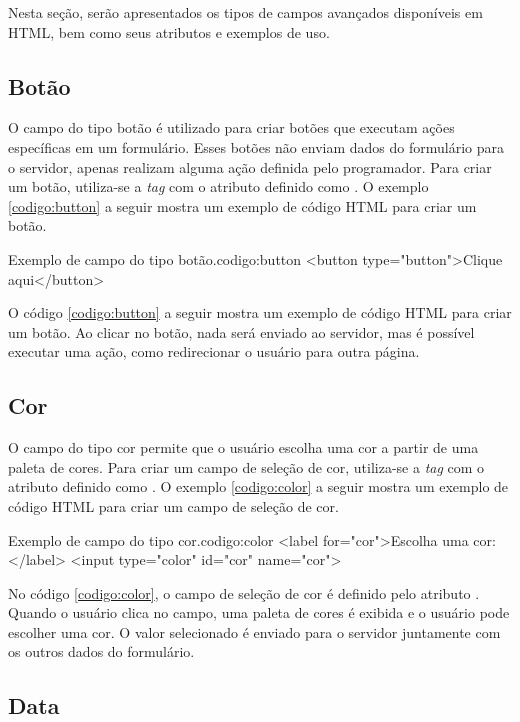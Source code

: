 Nesta seção, serão apresentados os tipos de campos avançados disponíveis em HTML, bem como seus atributos e exemplos de uso.

\subsection{Botão}

O campo do tipo botão é utilizado para criar botões que executam ações específicas em um formulário. Esses botões não enviam dados do formulário para o servidor, apenas realizam alguma ação definida pelo programador. Para criar um botão, utiliza-se a \textit{tag}  com o atributo  definido como . O exemplo \ref{codigo:button} a seguir mostra um exemplo de código HTML para criar um botão.

\begin{htmlcode}{Exemplo de campo do tipo botão.}{codigo:button}
<button type="button">Clique aqui</button>
\end{htmlcode}

O código \ref{codigo:button} a seguir mostra um exemplo de código HTML para criar um botão. Ao clicar no botão, nada será enviado ao servidor, mas é possível executar uma ação, como redirecionar o usuário para outra página.

\subsection{Cor}

O campo do tipo cor permite que o usuário escolha uma cor a partir de uma paleta de cores. Para criar um campo de seleção de cor, utiliza-se a \textit{tag}  com o atributo  definido como . O exemplo \ref{codigo:color} a seguir mostra um exemplo de código HTML para criar um campo de seleção de cor.

\begin{htmlcode}{Exemplo de campo do tipo cor.}{codigo:color}
<label for="cor">Escolha uma cor:</label>
<input type="color" id="cor" name="cor">
\end{htmlcode}

No código \ref{codigo:color}, o campo de seleção de cor é definido pelo atributo . Quando o usuário clica no campo, uma paleta de cores é exibida e o usuário pode escolher uma cor. O valor selecionado é enviado para o servidor juntamente com os outros dados do formulário.

\subsection{Data}

